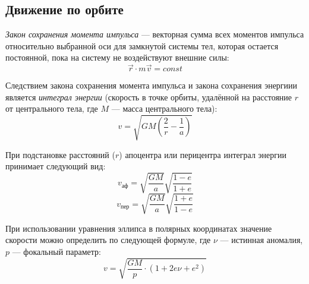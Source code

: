 \subsection{Движение по орбите}

\textit{Закон сохранения момента импульса} ---  векторная сумма всех моментов импульса относительно выбранной оси для замкнутой системы тел, которая остается постоянной, пока на систему не воздействуют внешние силы:
\begin{equation}
\vec{r} \cdot m\vec{v}=const  
\end{equation}

Следствием закона сохранения момента импульса и закона сохранения энергиии является        \textit{ интеграл энергии} (скорость в точке орбиты, удалённой на расстояние $r$ от центрального тела, где $M$ --- масса центрального тела):
\begin{equation}v=\sqrt{GM\left(\frac2r - \frac1a\right)}
\end{equation}

При подстановке расстояний ($r$) апоцентра или перицентра интеграл энергии принимает следующий вид:
\begin{equation}v_{\text{аф}}=\sqrt{\frac{GM}{a}} \sqrt{\frac{1-e}{1+e}}
\end{equation}
\begin{equation}v_{\text{пер}}=\sqrt{\frac{GM}{a}}\sqrt{\frac{1+e}{1-e}}
\end{equation}

При использовании уравнения эллипса в полярных координатах значение скорости можно определить по следующей формуле, где $\nu$ --- истинная аномалия, $p$ --- фокальный параметр:
\begin{equation}v=\sqrt{\frac{GM}{p}\cdot(1+2e\nu+e^2)}
\end{equation}
